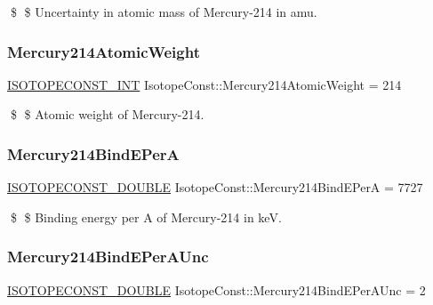 \$ \$ Uncertainty in atomic mass of Mercury-\/214 in amu. \mbox{\label{group___isotope_const-_mercury-_hg214_ga8c1e5f73ba95e8631f1e73545f19e783}} 
\subsubsection{\texorpdfstring{Mercury214\+Atomic\+Weight}{Mercury214AtomicWeight}}
{\footnotesize\ttfamily \mbox{\hyperlink{group___isotope_const-_macros_ga5f18360b3e99483a35c32d789e62621c}{I\+S\+O\+T\+O\+P\+E\+C\+O\+N\+S\+T\+\_\+\+I\+NT}} Isotope\+Const\+::\+Mercury214\+Atomic\+Weight = 214}

\$ \$ Atomic weight of Mercury-\/214. \mbox{\label{group___isotope_const-_mercury-_hg214_ga0837b15104443e59b51d6c96306cc0d2}} 
\subsubsection{\texorpdfstring{Mercury214\+Bind\+E\+PerA}{Mercury214BindEPerA}}
{\footnotesize\ttfamily \mbox{\hyperlink{group___isotope_const-_macros_ga8f45a7272ce02c0b4c65c44636ed719a}{I\+S\+O\+T\+O\+P\+E\+C\+O\+N\+S\+T\+\_\+\+D\+O\+U\+B\+LE}} Isotope\+Const\+::\+Mercury214\+Bind\+E\+PerA = 7727}

\$ \$ Binding energy per A of Mercury-\/214 in keV. \mbox{\label{group___isotope_const-_mercury-_hg214_gac7436e688a71af8a2b5466f5ca8d65ca}} 
\subsubsection{\texorpdfstring{Mercury214\+Bind\+E\+Per\+A\+Unc}{Mercury214BindEPerAUnc}}
{\footnotesize\ttfamily \mbox{\hyperlink{group___isotope_const-_macros_ga8f45a7272ce02c0b4c65c44636ed719a}{I\+S\+O\+T\+O\+P\+E\+C\+O\+N\+S\+T\+\_\+\+D\+O\+U\+B\+LE}} Isotope\+Const\+::\+Mercury214\+Bind\+E\+Per\+A\+Unc = 2}

